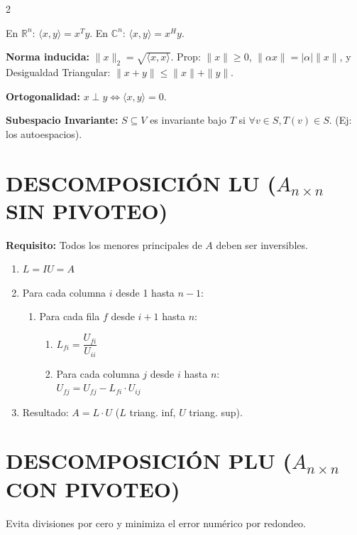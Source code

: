 \documentclass[10pt]{extarticle}
\newenvironment{term}
  {\begin{minipage}{\linewidth}}
  {\end{minipage}\par}
\begin{document}
\begin{multicols}{2}
\begin{term}
En $\mathbb{R}^n$: $\langle x,y\rangle = x^Ty$. En $\mathbb{C}^n$: $\langle x,y\rangle = x^Hy$.

\textbf{Norma inducida:} $\|x\|_2 = \sqrt{\langle x,x\rangle}$. Prop: $\|x\|\ge 0$, $\|\alpha x\| = |\alpha|\|x\|$, y Desigualdad Triangular: $\|x+y\| \le \|x\|+\|y\|$.

\textbf{Ortogonalidad:} $x \perp y \iff \langle x,y\rangle = 0$.

\textbf{Subespacio Invariante:} $S \subseteq V$ es invariante bajo $T$ si $\forall v \in S, T(v) \in S$. (Ej: los autoespacios).
\end{term}



\begin{term}
\section*{DESCOMPOSICIÓN LU ($A_{n\times n}$ SIN PIVOTEO)}
\textbf{Requisito:} Todos los menores principales de $A$ deben ser inversibles.

\begin{enumerate}
\item $L = I$\quad $U = A$
\item Para cada columna $i$ desde 1 hasta $n-1$:
\begin{enumerate}
\item Para cada fila $f$ desde $i+1$ hasta $n$:
\begin{enumerate}
\item $L_{fi} = \dfrac{U_{fi}}{U_{ii}}$
\item Para cada columna $j$ desde $i$ hasta $n$: \\ $U_{fj} = U_{fj} - L_{fi}\cdot U_{ij}$
\end{enumerate}
\end{enumerate}
\item Resultado: $A = L\cdot U$ ($L$ triang. inf, $U$ triang. sup).
\end{enumerate}
\end{term}

\begin{term}
\section*{DESCOMPOSICIÓN PLU ($A_{n\times n}$ CON PIVOTEO)}
Evita divisiones por cero y minimiza el error numérico por redondeo.


\end{term}
\end{multicols}
\end{document}

